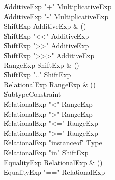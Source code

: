 \begin{bbgrammar}
    \| AdditiveExp \xcd"+" MultiplicativeExp\\
    \| AdditiveExp \xcd"-" MultiplicativeExp\\
 ShiftExp  \label{prod:ShiftExp}  \: AdditiveExp & ()\\
    \| ShiftExp \xcd"<<" AdditiveExp\\
    \| ShiftExp \xcd">>" AdditiveExp\\
    \| ShiftExp \xcd">>>" AdditiveExp\\
 RangeExp  \label{prod:RangeExp}  \: ShiftExp & ()\\
    \| ShiftExp  \xcd".." ShiftExp \\
 RelationalExp  \label{prod:RelationalExp}  \: RangeExp & ()\\
    \| SubtypeConstraint\\
    \| RelationalExp \xcd"<" RangeExp\\
    \| RelationalExp \xcd">" RangeExp\\
    \| RelationalExp \xcd"<=" RangeExp\\
    \| RelationalExp \xcd">=" RangeExp\\
    \| RelationalExp \xcd"instanceof" Type\\
    \| RelationalExp \xcd"in" ShiftExp\\
 EqualityExp  \label{prod:EqualityExp}  \: RelationalExp & ()\\
    \| EqualityExp \xcd"==" RelationalExp\\
\end{bbgrammar}

